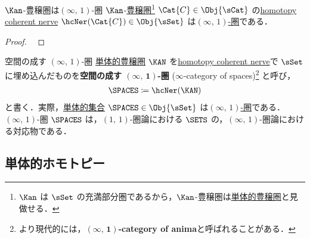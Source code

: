 \documentclass[TQFT_main]{subfiles}
\begin{document}
\begin{mytheo}[label=thm:Kan-enriched]{{$\Kan$}-豊穣圏は{$(\infty,\, 1)$-圏}}
    \hyperref[def:Kan]{$\Kan$}-\hyperref[def:enriched]{豊穣圏}\footnote{$\Kan$ は $\sSet$ の充満部分圏であるから，$\Kan$-豊穣圏は\hyperref[def:SimpCat]{単体的豊穣圏}と見做せる．} $\Cat{C} \in \Obj{\sCat}$ の\hyperref[def:nerve-hc]{homotopy coherent nerve} $\hcNer(\Cat{C}) \in \Obj{\sSet}$ は\hyperref[def:infinity-1]{$(\infty,\, 1)$-圏}である．
\end{mytheo}

\begin{proof}
    ~\cite[\href{https://kerodon.net/tag/00LJ}{Tag 00LJ}]{kerodon}
\end{proof}

\begin{myexample}[label=def:Spaces]{空間の成す {$(\infty,\, 1)$}-圏}
    \hyperref[def:SimpCat]{単体的豊穣圏} $\KAN$ を\hyperref[def:nerve-hc]{homotopy coherent nerve}で $\sSet$ に埋め込んだものを\textbf{空間の成す $\bm{(\infty,\, 1)}$-圏} ($\infty$-category of spaces)\footnote{より現代的には，$\bm{(\infty,\, 1)}$\textbf{-category of anima}と呼ばれることがある．} と呼び，
    \begin{align}
         \SPACES \coloneqq \hcNer (\KAN)
    \end{align}
    と書く．実際，\hyperref[def:SimpSet]{単体的集合} $\SPACES \in \Obj{\sSet}$ は\hyperref[def:infinity-1]{$(\infty,\, 1)$-圏}である\cite[\href{https://kerodon.net/tag/01YY}{Tag 01YY}]{kerodon}．
    $(\infty,\, 1)$-圏 $\SPACES$ は，$(1,\, 1)$-圏論における $\SETS$ の，$(\infty,\, 1)$-圏論における対応物である．
\end{myexample}


\subsection{単体的ホモトピー}
\end{document}
